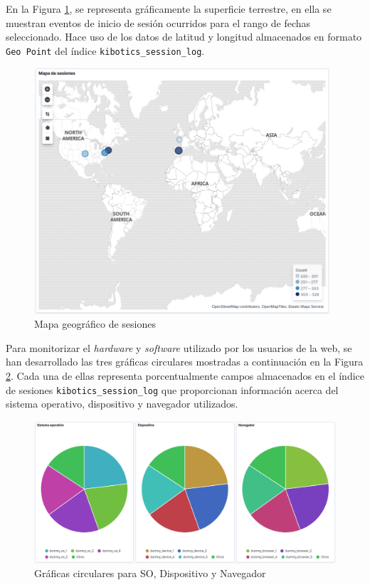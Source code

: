 \documentclass[a4paper, 12pt]{book}
\begin{document}
		En la Figura \ref{fig:kibana_map}, se representa gráficamente la superficie terrestre, en ella se muestran eventos de inicio de sesión ocurridos para el rango de fechas seleccionado. Hace uso de los datos de latitud y longitud almacenados en formato \texttt{Geo Point} del índice \texttt{kibotics\_session\_log}.
		\begin{figure}[H]
			\centering
			\includegraphics[width=11cm, keepaspectratio]{img/kibana_06_map}
			\caption{Mapa geográfico de sesiones}
			\label{fig:kibana_map}
		\end{figure}
		
		Para monitorizar el \textit{hardware} y \textit{software} utilizado por los usuarios de la web, se han desarrollado las tres gráficas circulares mostradas a continuación en la Figura \ref{fig:kibana_pie}. Cada una de ellas representa porcentualmente campos almacenados en el índice de sesiones  \texttt{kibotics\_session\_log} que proporcionan información acerca del sistema operativo, dispositivo y navegador utilizados.
		\begin{figure}[H]
			\centering
			\includegraphics[width=14cm, keepaspectratio]{img/kibana_07_pie}
			\caption{Gráficas circulares para SO, Dispositivo y Navegador}
			\label{fig:kibana_pie}
		\end{figure}
		
\end{document}
